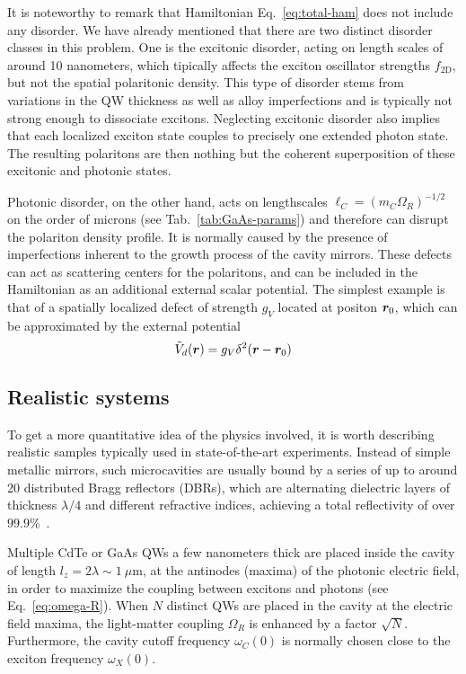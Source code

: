 It is noteworthy to remark that Hamiltonian Eq.~\eqref{eq:total-ham}
does not include any disorder. We have already mentioned that there
are two distinct disorder classes in this problem. One is the
excitonic disorder, acting on length scales of around 10 nanometers,
which tipically affects the exciton oscillator strengths
$f_{\text{2D}}$, but not the spatial polaritonic density. This type of
disorder stems from variations in the QW thickness as well as alloy
imperfections and is typically not strong enough to dissociate
excitons. Neglecting excitonic disorder also implies that each
localized exciton state couples to precisely one extended photon
state. The resulting polaritons are then nothing but the coherent
superposition of these excitonic and photonic states.

Photonic disorder, on the other hand, acts on lengthscales
$\ell_{C} = (m_{C}\Omega_R)^{-1/2}$ on the order of microns (see
Tab.~\ref{tab:GaAs-params}) and therefore can disrupt the polariton
density profile. It is normally caused by the presence of
imperfections inherent to the growth process of the cavity
mirrors. These defects can act as scattering centers for the
polaritons, and can be included in the Hamiltonian as an additional
external scalar potential. The simplest example is that of a spatially
localized defect of strength $g_V$ located at positon $\bm{r}_0$, which
can be approximated by the external potential
%
\begin{equation}\label{eq:defect-pot}
  \tilde{V}_d(\bm{r}) = g_V \delta^2(\bm{r} - \bm{r}_0)
\end{equation}
% 

\subsection{Realistic systems}
\label{subsec:realistic}

To get a more quantitative idea of the physics involved, it is worth
describing realistic samples typically used in state-of-the-art
experiments. Instead of simple metallic mirrors, such microcavities
are usually bound by a series of up to around 20 distributed Bragg
reflectors (DBRs), which are alternating dielectric layers of
thickness $\lambda/4$ and different refractive indices, achieving a
total reflectivity of over $99.9$\%~\cite{9780199228942}. 

Multiple CdTe or GaAs QWs a few nanometers thick are placed inside the
cavity of length $l_z = 2\lambda \sim 1~\mu$m, at the antinodes
(maxima) of the photonic electric field, in order to maximize the
coupling between excitons and photons (see
Eq.~\eqref{eq:omega-R}). When $N$ distinct QWs are placed in the
cavity at the electric field maxima, the light-matter coupling
$\Omega_R$ is enhanced by a factor $\sqrt{N}$. Furthermore, the cavity
cutoff frequency $\omega_C(0)$ is normally chosen close to the exciton
frequency $\omega_X(0)$.


